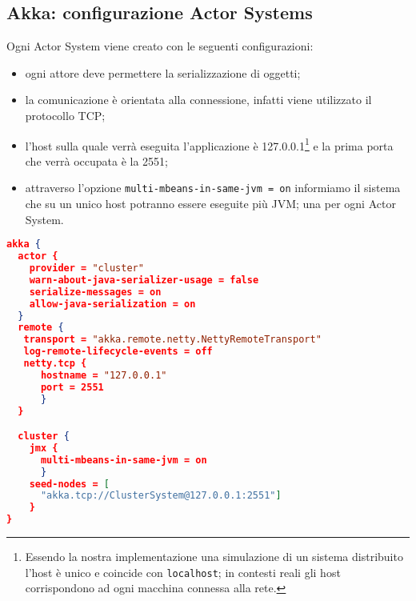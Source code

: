 

\subsection{Akka: configurazione Actor Systems}
\label{sec:akkaconf}
Ogni Actor System viene creato con le seguenti configurazioni:
\begin{itemize}
	\item ogni attore deve permettere la serializzazione di oggetti;
	\item la comunicazione è orientata alla connessione, infatti viene utilizzato il protocollo TCP;
	\item l'host sulla quale verrà eseguita l'applicazione è 127.0.0.1\footnote{Essendo la nostra implementazione una simulazione di un sistema distribuito l'host è unico e coincide con \texttt{localhost}; in contesti reali gli host corrispondono ad ogni macchina connessa alla rete. } e la prima porta che verrà occupata è la 2551;
	\item attraverso l'opzione \texttt{multi-mbeans-in-same-jvm = on} informiamo il sistema che su un unico host potranno essere eseguite più JVM; una per ogni Actor System.
\end{itemize}
\begin{lstlisting}[language=json]
akka {
  actor {
    provider = "cluster"
    warn-about-java-serializer-usage = false
    serialize-messages = on
    allow-java-serialization = on
  }
  remote {
   transport = "akka.remote.netty.NettyRemoteTransport"
   log-remote-lifecycle-events = off
   netty.tcp {
      hostname = "127.0.0.1"
      port = 2551
      }
  }

  cluster {
    jmx {
      multi-mbeans-in-same-jvm = on
      }
    seed-nodes = [
      "akka.tcp://ClusterSystem@127.0.0.1:2551"]
    }
}
\end{lstlisting}

